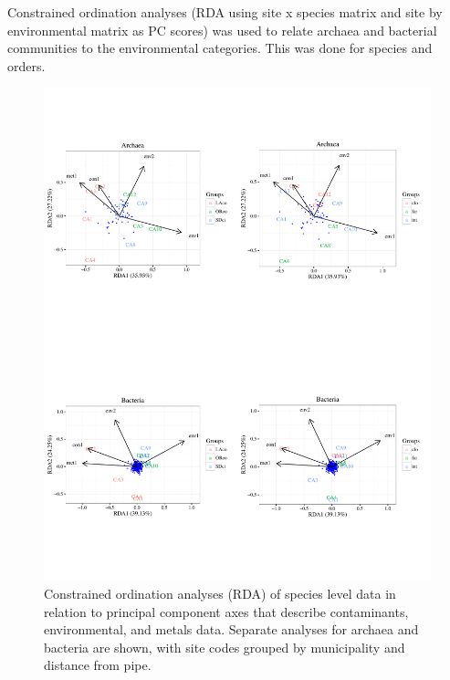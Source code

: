 \documentclass[letterpaper,12pt]{article}\usepackage[]{graphicx}\usepackage[]{color}
\newenvironment{knitrout}{}{} %
\begin{document}
Constrained ordination analyses (RDA using site x species matrix and site by environmental matrix as PC scores) was used to relate archaea and bacterial communities to the environmental categories.  This was done for species and orders.
\begin{knitrout}
\color{fgcolor}\begin{figure}[!ht]

{\centering \includegraphics[width=\textwidth]{figs/unnamed-chunk-6-1} 

}

\caption[Constrained ordination analyses (RDA) of species level data in relation to principal component axes that describe contaminants, environmental, and metals data]{Constrained ordination analyses (RDA) of species level data in relation to principal component axes that describe contaminants, environmental, and metals data.  Separate analyses for archaea and bacteria are shown, with site codes grouped by municipality and distance from pipe.}\label{fig:unnamed-chunk-6}
\end{figure}


\end{knitrout}
\end{document}
